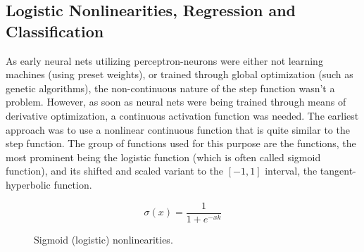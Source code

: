 		\subsection{Logistic Nonlinearities, Regression and Classification}
		
			As early neural nets utilizing perceptron-neurons were either not learning machines (using preset weights), or trained through global optimization (such as genetic algorithms), the non-continuous nature of the step function wasn't a problem.
			However, as soon as neural nets were being trained through means of derivative optimization, a continuous activation function was needed.
			The earliest approach was to use a nonlinear continuous function that is quite similar to the step function.
			The group of functions used for this purpose are the  functions, the most prominent being the logistic function (which is often called  sigmoid function), and its shifted and scaled variant to the $[-1, 1]$ interval, the tangent-hyperbolic function.
			
			\begin{figure}[ht]
				\centering
				\begin{minipage}[t]{0.4\linewidth}
					\begin{equation}
						\sigma(x) = \frac{1}{1+e^{-xk}}
					\end{equation}
				\end{minipage}
				\begin{minipage}[t]{0.3\linewidth}
				\end{minipage}
				\caption[Sigmoid nonlinearities]{Sigmoid (logistic) nonlinearities.}
				\label{fig:nonlins_sigmoid}
			\end{figure}
		
